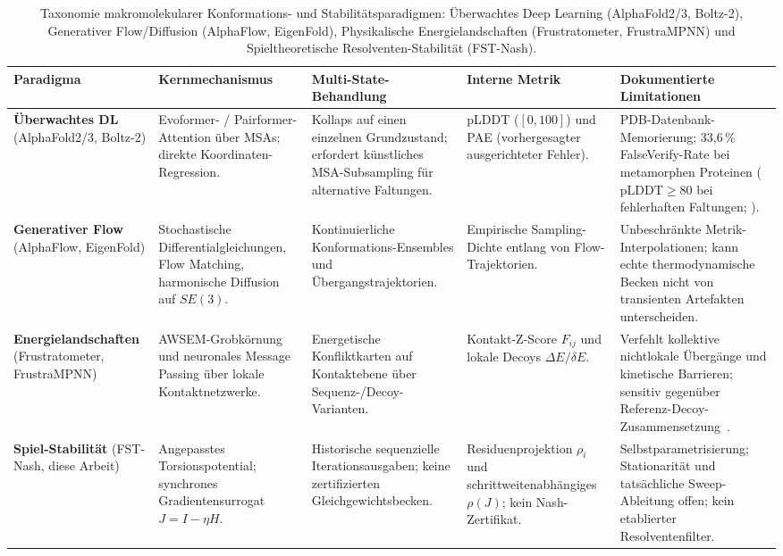 \documentclass[12pt,a4paper]{article}
\theoremstyle{remark}
\begin{document}
\begin{table}[htbp]
\centering
\caption{Taxonomie makromolekularer Konformations- und Stabilitätsparadigmen: Überwachtes Deep Learning (AlphaFold2/3, Boltz-2), Generativer Flow/Diffusion (AlphaFlow, EigenFold), Physikalische Energielandschaften (Frustratometer, FrustraMPNN) und Spieltheoretische Resolventen-Stabilität (FST-Nash).}
\label{tab:conformational-paradigms}
\scriptsize
\setlength{\tabcolsep}{3.5pt}
\begin{tabularx}{\textwidth}{@{}L{0.14\textwidth} L{0.20\textwidth} L{0.18\textwidth} L{0.16\textwidth} Y@{}}
\toprule
\textbf{Paradigma} & \textbf{Kernmechanismus} & \textbf{Multi-State-Behandlung} & \textbf{Interne Metrik} & \textbf{Dokumentierte Limitationen} \\
\midrule
\textbf{Überwachtes DL} \newline (AlphaFold2/3, Boltz-2) & Evoformer- / Pairformer-Attention über MSAs; direkte Koordinaten-Regression. & Kollaps auf einen einzelnen Grundzustand; erfordert künstliches MSA-Subsampling für alternative Faltungen. & pLDDT ($[0,100]$) und PAE (vorhergesagter ausgerichteter Fehler). & PDB-Datenbank-Memorierung; 33{,}6\,\% FalseVerify-Rate bei metamorphen Proteinen ($\text{pLDDT}\ge 80$ bei fehlerhaften Faltungen; \citealp{NatureComms2024,Thacker2026,Ye2026}). \\
\addlinespace
\textbf{Generativer Flow} \newline (AlphaFlow, EigenFold) & Stochastische Differentialgleichungen, Flow Matching, harmonische Diffusion auf $SE(3)$. & Kontinuierliche Konformations-Ensembles und Übergangstrajektorien. & Empirische Sampling-Dichte entlang von Flow-Trajektorien. & Unbeschränkte Metrik-Interpolationen; kann echte thermodynamische Becken nicht von transienten Artefakten unterscheiden. \\
\addlinespace
\textbf{Energielandschaften} \newline (Frustratometer, FrustraMPNN) & AWSEM-Grobkörnung und neuronales Message Passing über lokale Kontaktnetzwerke. & Energetische Konfliktkarten auf Kontaktebene über Sequenz-/Decoy-Varianten. & Kontakt-Z-Score $F_{ij}$ und lokale Decoys $\Delta E / \delta E$. & Verfehlt kollektive nichtlokale Übergänge und kinetische Barrieren; sensitiv gegenüber Referenz-Decoy-Zusammensetzung~\citep{Beining2026,Leusch2026}. \\
\addlinespace
\textbf{Spiel-Stabilität} \newline (FST-Nash, diese Arbeit) & Angepasstes Torsionspotential; synchrones Gradientensurrogat $J=I-\eta H$. & Historische sequenzielle Iterationsausgaben; keine zertifizierten Gleichgewichtsbecken. & Residuenprojektion $\rho_i$ und schrittweitenabhängiges $\rho(J)$; kein Nash-Zertifikat. & Selbstparametrisierung; Stationarität und tatsächliche Sweep-Ableitung offen; kein etablierter Resolventenfilter. \\
\bottomrule
\end{tabularx}
\end{table}
\end{document}
